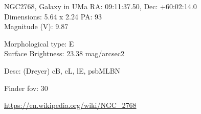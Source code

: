 \begin{block}{NGC2768, Galaxy in UMa}
    RA: 09:11:37.50, Dec: +60:02:14.0 \\ 
    Dimensions: 5.64 x 2.24 PA: 93 \\ 
    Magnitude (V): 9.87

    Morphological type: E \\ 
    Surface Brightness: 23.38 mag/arcsec2 

    Desc: (Dreyer) cB, cL, lE, psbMLBN 

    Finder fov: 30 

    \url{https://en.wikipedia.org/wiki/NGC_2768} 
\end{block}
